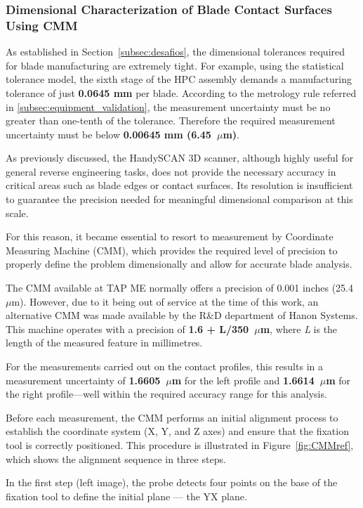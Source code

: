 \subsubsection{Dimensional Characterization of Blade Contact Surfaces Using CMM}
\label{cha:contactocmm}

As established in Section~\ref{subsec:desafios}, the dimensional tolerances required for blade manufacturing are extremely tight. For example, using the statistical tolerance model, the sixth stage of the HPC assembly demands a manufacturing tolerance of just \textbf{0.0645 mm} per blade. According to the metrology rule referred in \ref{subsec:equipment_validation}, the measurement uncertainty must be no greater than one-tenth of the tolerance. Therefore the required measurement uncertainty must be below \textbf{0.00645 mm (6.45~$\mu$m)}.

As previously discussed, the HandySCAN 3D scanner, although highly useful for general reverse engineering tasks, does not provide the necessary accuracy in critical areas such as blade edges or contact surfaces. Its resolution is insufficient to guarantee the precision needed for meaningful dimensional comparison at this scale.

For this reason, it became essential to resort to measurement by Coordinate Measuring Machine (CMM), which provides the required level of precision to properly define the problem dimensionally and allow for accurate blade analysis.

The CMM available at TAP ME normally offers a precision of 0.001 inches (25.4~$\mu$m). However, due to it being out of service at the time of this work, an alternative CMM was made available by the R\&D department of Hanon Systems. This machine operates with a precision of \textbf{1.6 + L/350~$\mu$m}, where \textit{L} is the length of the measured feature in millimetres.

For the measurements carried out on the contact profiles, this results in a measurement uncertainty of \textbf{1.6605~$\mu$m} for the left profile and \textbf{1.6614~$\mu$m} for the right profile---well within the required accuracy range for this analysis.


Before each measurement, the CMM performs an initial alignment process to establish the coordinate system (X, Y, and Z axes) and ensure that the fixation tool is correctly positioned. This procedure is illustrated in Figure~\ref{fig:CMMref}, which shows the alignment sequence in three steps.

In the first step (left image), the probe detects four points on the base of the fixation tool to define the initial plane — the YX plane.

